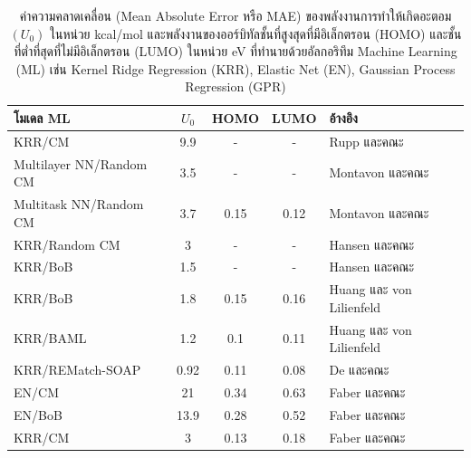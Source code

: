 \begin{table}[H]
    \begin{threeparttable}[b]
        \centering
        \caption{ค่าความคลาดเคลื่อน (Mean Absolute Error หรือ MAE) ของพลังงานการทำให้เกิดอะตอม $(U_{0})$ ในหน่วย kcal/mol
            และพลังงานของออร์บิทัลชั้นที่สูงสุดที่มีอิเล็กตรอน (HOMO) และชั้นที่ต่ำที่สุดที่ไม่มีอิเล็กตรอน (LUMO) ในหน่วย eV ที่ทำนายด้วยอัลกอริทึม
            Machine Learning (ML) เช่น Kernel Ridge Regression (KRR), Elastic Net (EN), Gaussian Process Regression
            (GPR)}
        \label{tab:pred_ener_atom_orb_ml}
        \begin{tabular}{lcccl}
            \toprule
            \textbf{โมเดล ML}                & \textbf{$U_{0}$} & HOMO & LUMO & \textbf{อ้างอิง}                               \\
            \midrule
            KRR/CM\tnote{1}                  & 9.9              & -    & -    & Rupp และคณะ\autocite{rupp2012}               \\
            Multilayer NN/Random CM\tnote{1} & 3.5              & -    & -    & Montavon และคณะ\autocite{montavon2012}       \\
            Multitask NN/Random CM\tnote{2}  & 3.7              & 0.15 & 0.12 & Montavon และคณะ\autocite{montavon2013}       \\
            KRR/Random CM\tnote{1}           & 3                & -    & -    & Hansen และคณะ\autocite{hansen2013}           \\
            KRR/BoB\tnote{1}                 & 1.5              & -    & -    & Hansen และคณะ\autocite{hansen2015}           \\
            KRR/BoB\tnote{2}                 & 1.8              & 0.15 & 0.16 & Huang และ von Lilienfeld\autocite{huang2016} \\
            KRR/BAML\tnote{2}                & 1.2              & 0.1  & 0.11 & Huang และ von Lilienfeld\autocite{huang2016} \\
            KRR/REMatch-SOAP\tnote{2}        & 0.92             & 0.11 & 0.08 & De และคณะ\autocite{de2016}                   \\
            EN/CM\tnote{3}                   & 21               & 0.34 & 0.63 & Faber และคณะ\autocite{faber2017}             \\
            EN/BoB\tnote{3}                  & 13.9             & 0.28 & 0.52 & Faber และคณะ\autocite{faber2017}             \\
            KRR/CM\tnote{3}                  & 3                & 0.13 & 0.18 & Faber และคณะ\autocite{faber2017}             \\

\end{tabular}
\end{threeparttable}
\end{table}
